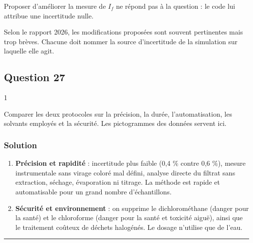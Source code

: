 \documentclass[11pt,a4paper]{article}
\providecommand{\tightlist}{\setlength{\itemsep}{0pt}\setlength{\parskip}{0pt}}
\begin{document}
\begin{piege}

Proposer d'améliorer la mesure de \(I_f\) ne répond pas à la question : le code lui attribue une incertitude nulle.

\end{piege}

\begin{jury}

Selon le rapport 2026, les modifications proposées sont souvent pertinentes mais trop brèves. Chacune doit nommer la source d'incertitude de la simulation sur laquelle elle agit.

\end{jury}

\hypertarget{question-27}{%
\subsection{Question 27}\label{question-27}}

\begin{indication}{1}

Comparer les deux protocoles sur la précision, la durée, l'automatisation, les solvants employés et la sécurité. Les pictogrammes des données servent ici.

\end{indication}

\hypertarget{solution-26}{%
\subsubsection{Solution}\label{solution-26}}

\begin{enumerate}
\def\labelenumi{\arabic{enumi}.}
\tightlist
\item
  \textbf{Précision et rapidité} : incertitude plus faible (0,4 \% contre 0,6 \%), mesure instrumentale sans virage coloré mal défini, analyse directe du filtrat sans extraction, séchage, évaporation ni titrage. La méthode est rapide et automatisable pour un grand nombre d'échantillons.
\item
  \textbf{Sécurité et environnement} : on supprime le dichlorométhane (danger pour la santé) et le chloroforme (danger pour la santé et toxicité aiguë), ainsi que le traitement coûteux de déchets halogénés. Le dosage n'utilise que de l'eau.
\end{enumerate}

\begin{center}\rule{0.5\linewidth}{0.5pt}\end{center}
\end{document}
